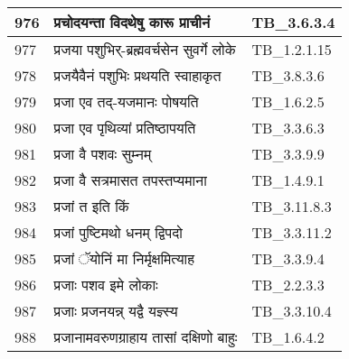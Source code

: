 \documentclass[17pt]{extarticle}
\begin{document}
\begin{longtable}{||p{0.4in}||p{4.9in}||p{0.9in}||}
    \hline
        
    976 & प्रचोदयन्ता विदथेषु कारू प्राचीनं & TB\_3.6.3.4       \\
    
    \hline
        
    977 & प्रजया पशुभिर्{-}ब्रह्मवर्चसेन सुवर्गे लोके & TB\_1.2.1.15       \\
    
    \hline
        
    978 & प्रजयैवैनं पशुभिः प्रथयति स्वाहाकृत & TB\_3.8.3.6       \\
    
    \hline
        
    979 & प्रजा एव तद्{-}यजमानः पोषयति & TB\_1.6.2.5       \\
    
    \hline
        
    980 & प्रजा एव पृथिव्यां प्रतिष्ठापयति & TB\_3.3.6.3       \\
    
    \hline
        
    981 & प्रजा वै पशवः सुम्नम् & TB\_3.3.9.9       \\
    
    \hline
        
    982 & प्रजा वै सत्रमासत तपस्तप्यमाना & TB\_1.4.9.1       \\
    
    \hline
        
    983 & प्रजां त इति किं & TB\_3.11.8.3       \\
    
    \hline
        
    984 & प्रजां पुष्टिमथो धनम् द्विपदो & TB\_3.3.11.2       \\
    
    \hline
        
    985 & प्रजां ॅयोनिं मा निर्मृक्षमित्याह & TB\_3.3.9.4       \\
    
    \hline
        
    986 & प्रजाः पशव इमे लोकाः & TB\_2.2.3.3       \\
    
    \hline
        
    987 & प्रजाः प्रजनयन्न् यद्वै यज्ञ्स्य & TB\_3.3.10.4       \\
    
    \hline
        
    988 & प्रजानामवरुणग्राहाय तासां दक्षिणो बाहुः & TB\_1.6.4.2       \\
    

\end{longtable}
\end{document}
